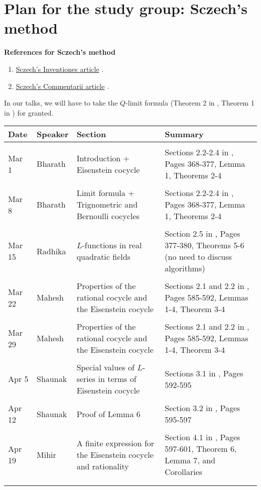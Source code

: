 \documentclass[11pt,a4paper,notitlepage]{article}
\begin{document}
\section{Plan for the study group: Sczech's method}	
	\textbf{References for Sczech's method}
\begin{enumerate}
\item \href{sczech-eisenstein.pdf}{Sczech's Inventiones  article}	 \cite{MR1231838}.
\item \href{sczech_real_quadratic_fields.pdf}{Sczech's Commentarii  article} \cite{MR1171300}.
\end{enumerate}
In our talks, we will have to take the $Q$-limit formula (Theorem 2 in \cite{MR1231838}, Theorem 1 in \cite{MR1171300}) for granted.
\begin{center}
\begin{tabularx}{\textwidth}{p{6cm}p{5cm}p{5cm}p{5cm}}
\toprule  
Date & Speaker & Section  & Summary  \\ 
\midrule \\
Mar 1 & Bharath & Introduction + Eisenstein cocycle  & Sections 2.2-2.4 in \cite{MR1171300}, Pages 368-377, Lemma 1, Theorems 2-4\\ \\
Mar 8 & Bharath &  Limit formula + Trignometric and Bernoulli cocycles  & Sections 2.2-2.4 in \cite{MR1171300}, Pages 368-377, Lemma 1, Theorems 2-4  \\ \\
Mar 15 & Radhika &  $L$-functions in real quadratic fields & Section 2.5 in \cite{MR1171300}, Pages 377-380, Theorems 5-6 (no need to discuss algorithms)\\ \\ 
 Mar 22  & Mahesh & 	Properties of the rational cocycle and the Eisenstein cocycle & Sections 2.1 and 2.2 in \cite{MR1231838}, Pages 585-592, Lemmas 1-4, Theorem 3-4 \\ \\
  Mar 29  & Mahesh & 	Properties of the rational cocycle and the Eisenstein cocycle & Sections 2.1 and 2.2 in \cite{MR1231838}, Pages 585-592, Lemmas 1-4, Theorem 3-4 \\ \\
Apr 5  & Shaunak & 	Special values of $L$-series in terms of Eisenstein cocycle & Sections 3.1 in \cite{MR1231838}, Pages 592-595  \\ \\
Apr 12  & Shaunak &  Proof of Lemma 6 &  Section 3.2 in \cite{MR1231838}, Pages 595-597 \\ \\
Apr 19  & Mihir &  A finite expression for the Eisenstein cocycle and rationality &  Section 4.1 in \cite{MR1231838}, Pages 597-601, Theorem 6, Lemma 7, and Corollaries \\ \\
\bottomrule \\
\end{tabularx}
\end{center}
\end{document}
